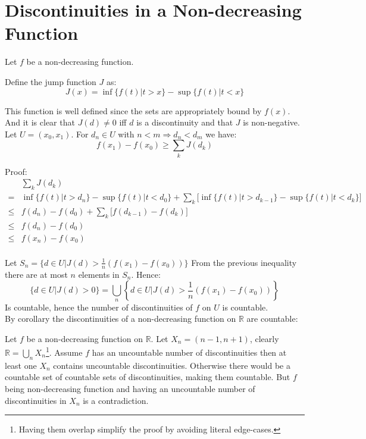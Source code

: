 
\section{Discontinuities in a Non-decreasing Function}

Let $f$ be a non-decreasing function.

Define the jump function $J$ as:
\[ J(x) = \inf\{f(t) | t > x\} - \sup\{f(t) | t < x\}\]

This function is well defined since the sets are appropriately bound by $f(x)$. And it is clear that $J(d) \neq 0$ iff $d$  is a discontinuity and that $J$ is non-negative.
\\

Let $U = (x_0,x_1)$. For $d_n \in U$ with $n < m \Rightarrow d_n < d_m$ we have:
\[f(x_1)-f(x_0) \geq \sum_{k}J(d_k)\]

Proof:
\begin{equation*}
\begin{aligned}
	&\sum_{k}J(d_k) \\
	=& \inf\{f(t) | t > d_n\} - \sup\{f(t) | t < d_0\} + \sum_k\big[\inf\{f(t) | t > d_{k-1}\} - \sup\{f(t) | t < d_k\}\big] \\
	\leq & f(d_n)-f(d_0) + \sum_k\big[f(d_{k-1})-f(d_k)\big] \\
	\leq & f(d_n)-f(d_0)\\
	\leq & f(x_n)-f(x_0)\\
\end{aligned}
\end{equation*}

Let $ S_n = \{d \in U | J(d) > \frac{1}{n}(f(x_1)-f(x_0)) \}$
From the previous inequality there are at most $n$ elements in $S_n$.
Hence:
\[\{d\in U | J(d) > 0\} = \bigcup_{n}\left\{d \in U | J(d) > \frac{1}{n}(f(x_1)-f(x_0))\right\}\]
Is countable, hence the number of discontinuities of $f$ on $U$ is countable.
\\

By corollary the discontinuities of a non-decreasing function on $\mathbb{R}$ are countable:

Let $f$ be a non-decreasing function on $\mathbb{R}$.
Let $X_n = (n-1,n+1)$, clearly $\mathbb{R} = \bigcup_{n}X_n$\footnote{Having them overlap simplify the proof by avoiding literal edge-cases.}.
Assume $f$ has an uncountable number of discontinuities then at least one $X_n$ contains uncountable discontinuities.
Otherwise there would be a countable set of countable sets of discontinuities, making them countable.
But $f$ being non-decreasing function and having an uncountable number of discontinuities in $X_n$ is a contradiction.
